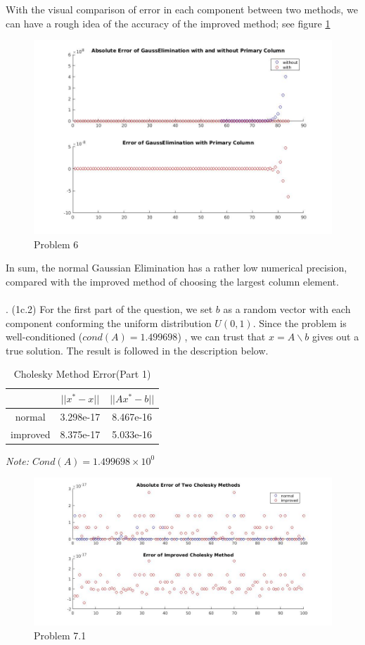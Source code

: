 \documentclass[11pt]{article}
\begin{document}
With the visual comparison of error in each component between two methods, we can have a rough idea of the accuracy of the improved method; see figure \ref{fig:f_6}
\begin{figure}[ht]
	\centering
	\label{fig:f_6}
	\caption{Problem 6}
	\includegraphics[width=\textwidth]{gaussian.jpg}
\end{figure}

In sum, the normal Gaussian Elimination has a rather low numerical precision, compared with the improved method of choosing the largest column element.
\\\\
. (1c.2) For the first part of the question, we set $b$ as a random vector with each component conforming the uniform distribution $U(0, 1)$.
Since the problem is well-conditioned ($cond(A)=1.499698$) , we can trust that $x = A \backslash b$ gives out a true solution.
The result is followed in the description below.
\begin{table}[ht]
	\caption{Cholesky Method Error(Part 1)}
	\centering
	\begin{tabular}{c|cc}
		\hline
		& $||x^*-x||$ & $||Ax^*-b||$ \\
		\hline
		normal   & 3.298e-17 & 8.467e-16 \\
		improved & 8.375e-17 & 5.033e-16 \\
		\hline
	\end{tabular}
	
	\emph{Note: $Cond(A)=1.499698\times 10^{0}$}
\end{table}

\begin{figure}[ht]
	\centering
	\caption{Problem 7.1}
	\includegraphics[width=\textwidth]{cholesky1.jpg}
\end{figure}
\end{document}
